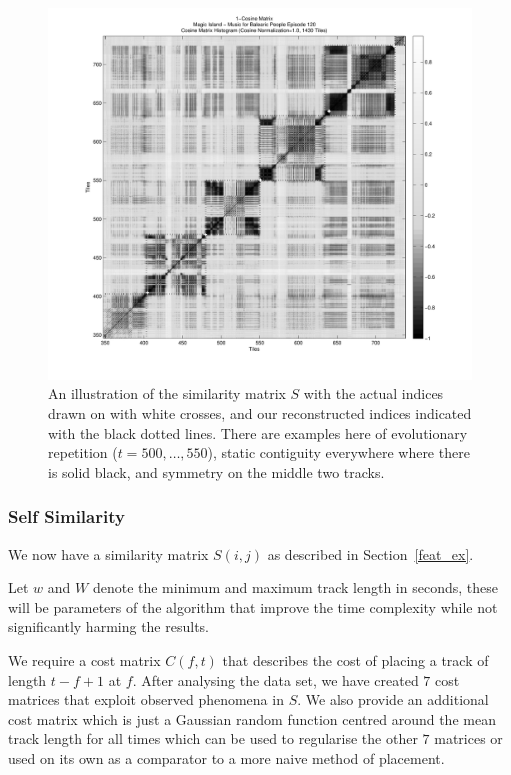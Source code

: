 \documentclass[twocolumn]{article}
\begin{document}
	\begin{figure}[t]
		\centering
		\includegraphics[width=1.08\textwidth]{images/S}
		\caption{An illustration of the similarity matrix $S$ with the actual indices drawn on with white crosses, and our reconstructed indices indicated with the black dotted lines. There are examples here of evolutionary repetition ($t=500,\ldots,550$), static contiguity everywhere where there is solid black, and symmetry on the middle two tracks.}
		\label{fig:simmatrix}
	\end{figure} 
	
	\subsubsection{Self Similarity}\label{costmatrix_sec} %
	
	We now have a similarity matrix $S(i,j)$ as described in Section~\ref{feat_ex}. 
	
	Let $w$ and $W$ denote the minimum and maximum track length in seconds, these will be parameters of the algorithm that improve the time complexity while not significantly harming the results. 
	
	We require a cost matrix $C(f,t)$ that describes the cost of placing a track of length $t-f+1$ at $f$. After analysing the data set, we have created $7$ cost matrices that exploit observed phenomena in $S$. We also provide an additional cost matrix which is just a Gaussian random function centred around the mean track length for all times which can be used to regularise the other $7$ matrices or used on its own as a comparator to a more naive method of placement. 
	
\end{document}
